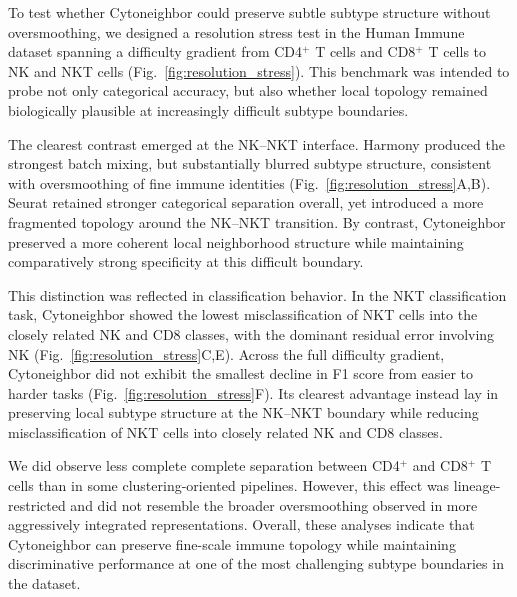 \documentclass[11pt]{article}
\begin{document}
To test whether Cytoneighbor could preserve subtle subtype structure without oversmoothing, we designed a resolution stress test in the Human Immune dataset spanning a difficulty gradient from CD4$^{+}$ T cells and CD8$^{+}$ T cells to NK and NKT cells (Fig.~\ref{fig:resolution_stress}). This benchmark was intended to probe not only categorical accuracy, but also whether local topology remained biologically plausible at increasingly difficult subtype boundaries.

The clearest contrast emerged at the NK--NKT interface. Harmony produced the strongest batch mixing, but substantially blurred subtype structure, consistent with oversmoothing of fine immune identities (Fig.~\ref{fig:resolution_stress}A,B). Seurat retained stronger categorical separation overall, yet introduced a more fragmented topology around the NK--NKT transition. By contrast, Cytoneighbor preserved a more coherent local neighborhood structure while maintaining comparatively strong specificity at this difficult boundary.

This distinction was reflected in classification behavior. In the NKT classification task, Cytoneighbor showed the lowest misclassification of NKT cells into the closely related NK and CD8 classes, with the dominant residual error involving NK (Fig.~\ref{fig:resolution_stress}C,E). 
Across the full difficulty gradient, Cytoneighbor did not exhibit the smallest decline in F1 score from easier to harder tasks (Fig.~\ref{fig:resolution_stress}F). Its clearest advantage instead lay in preserving local subtype structure at the NK--NKT boundary while reducing misclassification of NKT cells into closely related NK and CD8 classes.

We did observe less complete complete separation between CD4$^{+}$ and CD8$^{+}$ T cells than in some clustering-oriented pipelines. However, this effect was lineage-restricted and did not resemble the broader oversmoothing observed in more aggressively integrated representations. Overall, these analyses indicate that Cytoneighbor can preserve fine-scale immune topology while maintaining discriminative performance at one of the most challenging subtype boundaries in the dataset.
\end{document}
